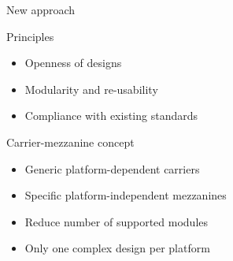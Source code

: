 \documentclass[compress,red]{beamer}
\begin{document}
\begin{frame}{New approach}

  \begin{block}{Principles}
    \begin{itemize}
    \item Openness of designs
    \item Modularity and re-usability
    \item Compliance with existing standards
    \end{itemize}
  \end{block}

  \pause
  \begin{block}{Carrier-mezzanine concept}
    \begin{itemize}
    \item Generic platform-dependent carriers
    \item Specific platform-independent mezzanines
    \item Reduce number of supported modules
    \item Only one complex design per platform
    \end{itemize}
  \end{block}




\end{frame}
\end{document}
